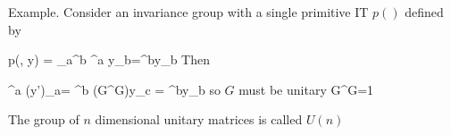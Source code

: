 Example. Consider
an invariance group
with a single
primitive IT $p()$ defined by

\beq
p(, y) = \delta_a^b ^a y_b=^by_b
\eeq
Then

\beq
{}^a (y')_a=
^b (G^\dagger G)y_c = ^by_b
\eeq
so $G$ must be unitary
\beq
G^\dagger G=1
\eeq
 
The group of $n$ dimensional unitary matrices is called $U(n)$



